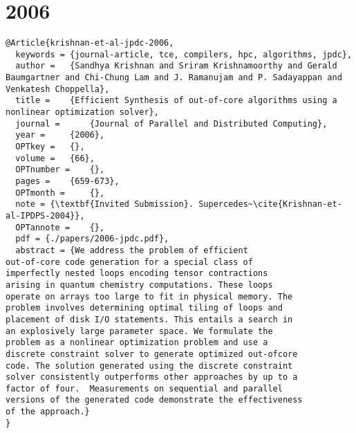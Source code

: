\documentclass[11pt]{article}
\begin{document}
\section{2006}
\label{sec:org62ba4b8}
\lstset{language=bibtex,label= ,caption= ,captionpos=b,numbers=none}
\begin{lstlisting}
@Article{krishnan-et-al-jpdc-2006,
  keywords = {journal-article, tce, compilers, hpc, algorithms, jpdc},
  author = 	 {Sandhya Krishnan and Sriram Krishnamoorthy and Gerald Baumgartner and Chi-Chung Lam and J. Ramanujam and P. Sadayappan and Venkatesh Choppella},
  title = 	 {Efficient Synthesis of out-of-core algorithms using a nonlinear optimization solver},
  journal = 	 {Journal of Parallel and Distributed Computing},
  year = 	 {2006},
  OPTkey = 	 {},
  volume = 	 {66},
  OPTnumber = 	 {},
  pages = 	 {659-673},
  OPTmonth = 	 {},
  note = {\textbf{Invited Submission}. Supercedes~\cite{Krishnan-et-al-IPDPS-2004}},
  OPTannote = 	 {},
  pdf = {./papers/2006-jpdc.pdf},
  abstract = {We address the problem of efficient
out-of-core code generation for a special class of
imperfectly nested loops encoding tensor contractions
arising in quantum chemistry computations. These loops
operate on arrays too large to fit in physical memory. The
problem involves determining optimal tiling of loops and
placement of disk I/O statements. This entails a search in
an explosively large parameter space. We formulate the
problem as a nonlinear optimization problem and use a
discrete constraint solver to generate optimized out-ofcore
code. The solution generated using the discrete constraint
solver consistently outperforms other approaches by up to a
factor of four.  Measurements on sequential and parallel
versions of the generated code demonstrate the effectiveness
of the approach.}
}


\end{lstlisting}
\end{document}
